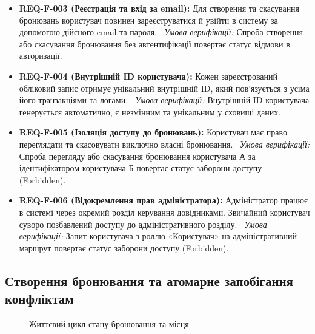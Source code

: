 \begin{itemize}[leftmargin=*,labelindent=0pt]
    \item \textbf{REQ-F-003 (Реєстрація та вхід за email):} Для створення та скасування бронювань користувач повинен зареєструватися й увійти в систему за допомогою дійсного email та пароля.~
    \textit{Умова верифікації:} Спроба створення або скасування бронювання без автентифікації повертає статус відмови в авторизації.
    
    \item \textbf{REQ-F-004 (Внутрішній ID користувача):} Кожен зареєстрований обліковий запис отримує унікальний внутрішній ID, який пов'язується з усіма його транзакціями та логами.~
    \textit{Умова верифікації:} Внутрішній ID користувача генерується автоматично, є незмінним та унікальним у сховищі даних.
    
    \item \textbf{REQ-F-005 (Ізоляція доступу до бронювань):} Користувач має право переглядати та скасовувати виключно власні бронювання.~
    \textit{Умова верифікації:} Спроба перегляду або скасування бронювання користувача А за ідентифікатором користувача Б повертає статус заборони доступу (Forbidden).
    
    \item \textbf{REQ-F-006 (Відокремлення прав адміністратора):} Адміністратор працює в системі через окремий розділ керування довідниками. Звичайний користувач суворо позбавлений доступу до адміністративного розділу.~
    \textit{Умова верифікації:} Запит користувача з роллю «Користувач» на адміністративний маршрут повертає статус заборони доступу (Forbidden).
\end{itemize}

\subsection{Створення бронювання та атомарне запобігання конфліктам}\label{sec:funktsional-bronuvannia}

\begin{figure}[htbp]
\centering
{}
\caption{Життєвий цикл стану бронювання та місця}\label{fig:booking-lifecycle}
\end{figure}

